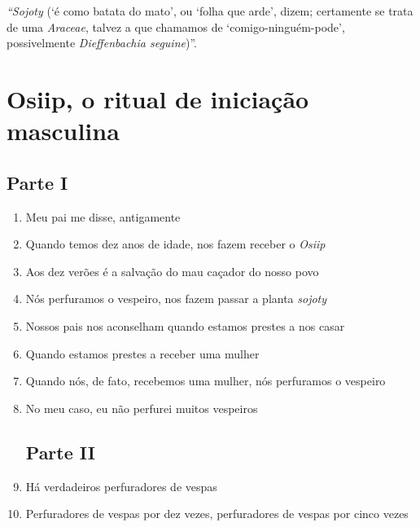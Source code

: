  \textit{``Sojoty} (`é como batata do mato', ou `folha que arde',
 dizem; certamente se trata de uma \textit{Araceae}, talvez a que chamamos
 de `comigo-ninguém-pode', possivelmente \textit{Dieffenbachia
 seguine})''.
 \vspace*{\fill}

 \chapter{Osiip, o ritual de iniciação masculina}

 \section{Parte I}

\begin{enumerate}
 \item Meu pai me disse, antigamente

 \item Quando temos dez anos de idade, nos fazem receber o \textit{Osiip}

 \item Aos dez verões é a salvação do mau caçador do nosso povo

 \item Nós perfuramos o vespeiro, nos fazem passar a planta \textit{sojoty}

 \begin{center}\end{center}

 \item Nossos pais nos aconselham quando estamos prestes a nos casar

 \item Quando estamos prestes a receber uma mulher

 \item Quando nós, de fato, recebemos uma mulher, nós perfuramos o vespeiro

 \item No meu caso, eu não perfurei muitos vespeiros

 \section{Parte II}

 \item Há verdadeiros perfuradores de vespas

 \item Perfuradores de vespas por dez vezes, perfuradores de vespas por cinco vezes


\end{enumerate}
